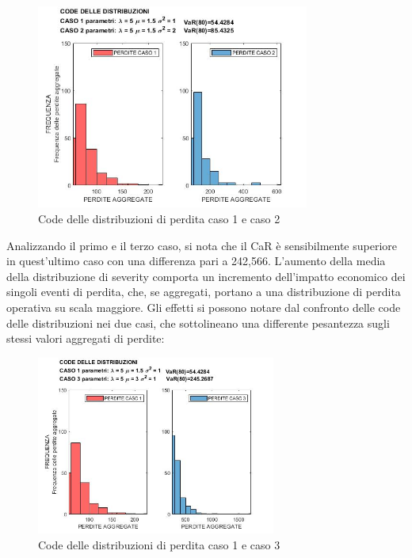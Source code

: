 \documentclass[titlepage]{article}
\begin{document}
\begin{itemize}
{\begin{figure}[htbp]
	\centering
	\includegraphics[width=0.8\textwidth]{CODE 1VS2.jpg}
	\caption{\label{fig:CODE 1VS2.jpg}Code delle distribuzioni di perdita caso 1 e caso 2}
\end{figure}
	Analizzando il primo e il terzo caso, si nota che il CaR è sensibilmente superiore in quest’ultimo caso con una differenza pari a 242,566. L’aumento della media della distribuzione di severity comporta un incremento dell’impatto economico dei singoli eventi di perdita, che, se aggregati, portano a una distribuzione di perdita operativa su scala maggiore. Gli effetti si possono notare dal confronto delle code delle distribuzioni nei due casi, che sottolineano una differente pesantezza sugli stessi valori aggregati di perdite:
\begin{figure}[htbp]
	\centering
	\includegraphics[width=0.7\textwidth]{CODE1VS3.jpg}
	\caption{\label{fig:CODE 1VS3.jpg}Code delle distribuzioni di perdita caso 1 e caso 3}
\end{figure}

}
\end{itemize}
\end{document}
